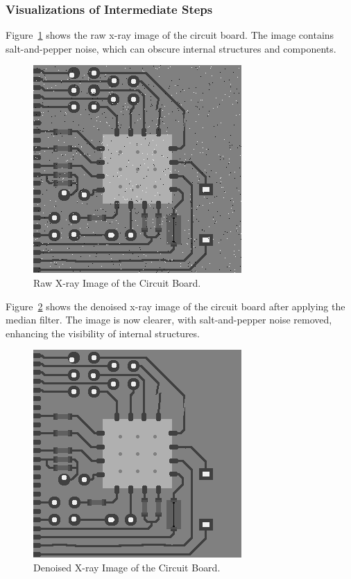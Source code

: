 \documentclass[a4paper,12pt]{article}
\begin{document}
\subsubsection{Visualizations of Intermediate Steps}

Figure~\ref{fig:image_raw} shows the raw x-ray image of the circuit board. The image contains salt-and-pepper noise, which can obscure internal structures and components.

\begin{figure}[!htbp]
    \centering
    \includegraphics[width=0.5\linewidth]{data/output/circuit_board_qa/image_raw.png}
    \caption{Raw X-ray Image of the Circuit Board.}
    \label{fig:image_raw}
\end{figure}

Figure~\ref{fig:image_denoised} shows the denoised x-ray image of the circuit board after applying the median filter. The image is now clearer, with salt-and-pepper noise removed, enhancing the visibility of internal structures.

\begin{figure}[!htbp]
    \centering
    \includegraphics[width=0.5\linewidth]{data/output/circuit_board_qa/image_denoised.png}
    \caption{Denoised X-ray Image of the Circuit Board.}
    \label{fig:image_denoised}
\end{figure}
\end{document}
